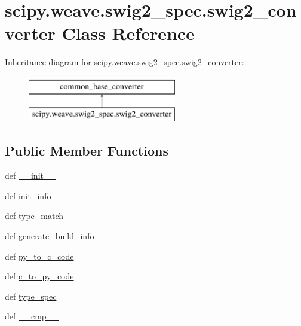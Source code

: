 \hypertarget{classscipy_1_1weave_1_1swig2__spec_1_1swig2__converter}{}\section{scipy.\+weave.\+swig2\+\_\+spec.\+swig2\+\_\+converter Class Reference}
\label{classscipy_1_1weave_1_1swig2__spec_1_1swig2__converter}
Inheritance diagram for scipy.\+weave.\+swig2\+\_\+spec.\+swig2\+\_\+converter\+:\begin{figure}[H]
\begin{center}
\leavevmode
\includegraphics[height=2.000000cm]{classscipy_1_1weave_1_1swig2__spec_1_1swig2__converter}
\end{center}
\end{figure}
\subsection*{Public Member Functions}
\begin{DoxyCompactItemize}
\item 
def \hyperlink{classscipy_1_1weave_1_1swig2__spec_1_1swig2__converter_a47881f32806badf01a20e8404b57a644}{\+\_\+\+\_\+init\+\_\+\+\_\+}
\item 
def \hyperlink{classscipy_1_1weave_1_1swig2__spec_1_1swig2__converter_ac1ad5134f1dd60c8ca31beeaec2187e4}{init\+\_\+info}
\item 
def \hyperlink{classscipy_1_1weave_1_1swig2__spec_1_1swig2__converter_a79be35a38fc4990b088dbb9355db80da}{type\+\_\+match}
\item 
def \hyperlink{classscipy_1_1weave_1_1swig2__spec_1_1swig2__converter_ae32a824b29ffd29bf444c22be6af8133}{generate\+\_\+build\+\_\+info}
\item 
def \hyperlink{classscipy_1_1weave_1_1swig2__spec_1_1swig2__converter_a8695b1f7bea0c18f0bdaf34bd9fdb342}{py\+\_\+to\+\_\+c\+\_\+code}
\item 
def \hyperlink{classscipy_1_1weave_1_1swig2__spec_1_1swig2__converter_a86ba9007c7f8195bce04f7628dbbefca}{c\+\_\+to\+\_\+py\+\_\+code}
\item 
def \hyperlink{classscipy_1_1weave_1_1swig2__spec_1_1swig2__converter_a92464279ad0d4a0694b41e2c26ffd5be}{type\+\_\+spec}
\item 
def \hyperlink{classscipy_1_1weave_1_1swig2__spec_1_1swig2__converter_aa7c3aca09ba47f6b7ccfb05e3a428c57}{\+\_\+\+\_\+cmp\+\_\+\+\_\+}
\end{DoxyCompactItemize}
